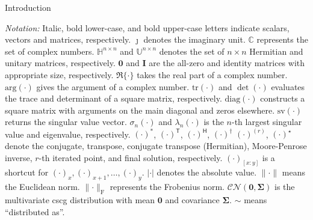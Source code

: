 \documentclass[journal]{IEEEtran}
\begin{document}
\begin{section}{Introduction}


	\emph{Notation:}
	Italic, bold lower-case, and bold upper-case letters indicate scalars, vectors and matrices, respectively.
	$\jmath$ denotes the imaginary unit.
	$\mathbb{C}$ represents the set of complex numbers.
	$\mathbb{H}^{n \times n}$ and $\mathbb{U}^{n \times n}$ denotes the set of $n \times n$ Hermitian and unitary matrices, respectively.
	$\mathbf{0}$ and $\mathbf{I}$ are the all-zero and identity matrices with appropriate size, respectively.
	$\Re\{\cdot\}$ takes the real part of a complex number.
	$\mathrm{arg}(\cdot)$ gives the argument of a complex number.
	$\mathrm{tr}(\cdot)$ and $\det(\cdot)$ evaluates the trace and determinant of a square matrix, respectively.
	$\mathrm{diag}(\cdot)$ constructs a square matrix with arguments on the main diagonal and zeros elsewhere.
	$\mathrm{sv}(\cdot)$ returns the singular value vector.
	$\sigma_n(\cdot)$ and $\lambda_n(\cdot)$ is the $n$-th largest singular value and eigenvalue, respectively.
	$(\cdot)^*$, $(\cdot)^\mathsf{T}$, $(\cdot)^\mathsf{H}$, $(\cdot)^\dagger$ $(\cdot)^{(r)}$, $(\cdot)^{\star}$ denote the conjugate, transpose, conjugate transpose (Hermitian), Moore-Penrose inverse, $r$-th iterated point, and final solution, respectively.
	$(\cdot)_{[x:y]}$ is a shortcut for $(\cdot)_x,(\cdot)_{x+1},\ldots,(\cdot)_y$.
	$\lvert \cdot \rvert$ denotes the absolute value.
	$\lVert \cdot \rVert$ means the Euclidean norm.
	$\lVert \cdot \rVert _\mathrm{F}$ represents the Frobenius norm.
	$\mathcal{CN}(\mathbf{0}, \mathbf{\Sigma})$ is the multivariate \gls{cscg} distribution with mean $\mathbf{0}$ and covariance $\mathbf{\Sigma}$.
	$\sim$ means ``distributed as''.
\end{section}
\end{document}
